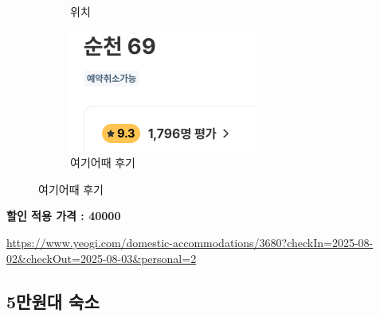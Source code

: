 \documentclass[10pt]{article}
\begin{document}
\begin{figure}[htbp]
\begin{subfigure}{0.3\textwidth}
    \caption{위치}
    \label{fig:2}
  \end{subfigure}
  \hfill
  \begin{subfigure}{0.3\textwidth}
    \centering
    \includegraphics[width=\linewidth]{fig/7_후기.png}
    \caption{여기어때 후기}
    \label{fig:3}
  \end{subfigure}
  \label{fig:three}
\end{figure}
\begin{center}
\textbf{할인 적용 가격 : 40000}
\end{center}
\url{https://www.yeogi.com/domestic-accommodations/3680?checkIn=2025-08-02&checkOut=2025-08-03&personal=2}

\newpage

\subsection{5만원대 숙소}
\end{document}
